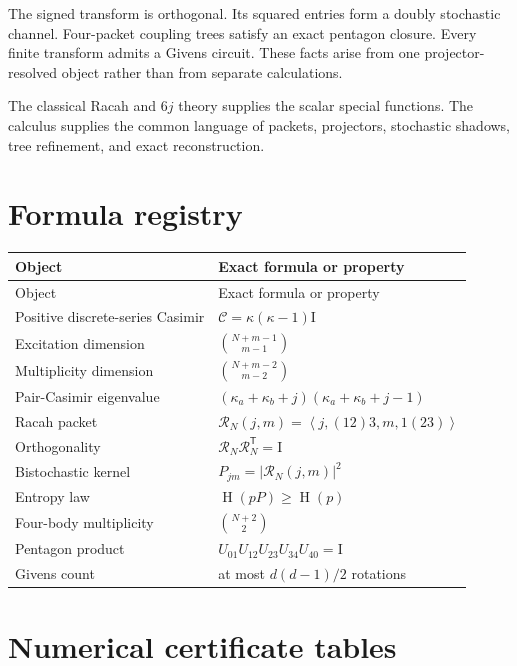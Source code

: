 \documentclass[11pt,openany]{report}
\theoremstyle{definition}
\theoremstyle{remark}
\newcommand{\Id}{\mathrm I}
\newcommand{\Cas}{\mathcal C}
\newcommand{\Rcal}{\mathcal R}
\newcommand{\ip}[2]{\left\langle#1,#2\right\rangle}
\newcommand{\Sh}{\operatorname{H}}
\begin{document}
The signed transform is orthogonal. Its squared entries form a doubly stochastic channel. Four-packet coupling trees satisfy an exact pentagon closure. Every finite transform admits a Givens circuit. These facts arise from one projector-resolved object rather than from separate calculations.

The classical Racah and $6j$ theory supplies the scalar special functions. The calculus supplies the common language of packets, projectors, stochastic shadows, tree refinement, and exact reconstruction.

\appendix

\chapter{Formula registry}

\begin{longtable}{L{0.30\textwidth}L{0.60\textwidth}}
\toprule
Object & Exact formula or property\\
\midrule
\endfirsthead
\toprule
Object & Exact formula or property\\
\midrule
\endhead
Positive discrete-series Casimir & $\Cas=\kappa(\kappa-1)\Id$\\
Excitation dimension & $\binom{N+m-1}{m-1}$\\
Multiplicity dimension & $\binom{N+m-2}{m-2}$\\
Pair-Casimir eigenvalue & $(\kappa_a+\kappa_b+j)(\kappa_a+\kappa_b+j-1)$\\
Racah packet & $\Rcal_N(j,m)=\ip{j,(12)3}{m,1(23)}$\\
Orthogonality & $\Rcal_N\Rcal_N^{\mathsf T}=\Id$\\
Bistochastic kernel & $P_{jm}=|\Rcal_N(j,m)|^2$\\
Entropy law & $\Sh(pP)\ge\Sh(p)$\\
Four-body multiplicity & $\binom{N+2}{2}$\\
Pentagon product & $U_{01}U_{12}U_{23}U_{34}U_{40}=\Id$\\
Givens count & at most $d(d-1)/2$ rotations\\
\bottomrule
\end{longtable}

\chapter{Numerical certificate tables}
\end{document}
